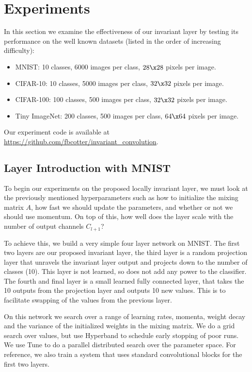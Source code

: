 \section{Experiments}\label{sec:experiments}
In this section we examine the effectiveness of our invariant layer by testing
its performance on the well known datasets (listed in the order of increasing
difficulty):
\begin{itemize}
  \item MNIST: 10 classes, 6000 images per class, $28\x 28$ pixels per image.
  \item CIFAR-10: 10 classes, 5000 images per class, $32\x 32$ pixels per image.
  \item CIFAR-100: 100 classes, 500 images per class, $32\x 32$ pixels per image. 
  \item Tiny ImageNet\cite{li_tiny_nodate}: 200 classes, 500 images per class, 
    $64 \x 64$ pixels per image. 
\end{itemize}
Our experiment code is available at
\url{https://github.com/fbcotter/invariant_convolution}.

\subsection{Layer Introduction with MNIST}\label{sec:ch5:mnist}
To begin our experiments on the proposed locally invariant layer, we must look at the
previously mentioned hyperparameters such as how to initialize the mixing matrix $A$, 
how fast we should update the parameters, and whether or not we should use
momentum. On top of this, how well does the layer scale with the number of
output channels $C_{l+1}$?

To achieve this, we build a very simple four layer network on MNIST. The first
two layers are our proposed invariant layer, the third layer is a random
projection layer that unravels the invariant layer output and projects
down to the number of classes (10). This layer is not learned, so does not add
any power to the classifier. The fourth and final layer is a small learned
fully connected layer, that takes the 10 outputs from the projection layer and
outputs 10 new values. This is to facilitate swapping of the values from the
previous layer. 

On this network we search over a range of learning rates, momenta, weight decay
and the variance of the initialized weights in the mixing matrix. We do a grid
search over values, but use Hyperband \cite{li_hyperband:_2016} to schedule early 
stopping of poor runs. We use Tune \cite{liaw2018tune} to do a parallel distributed
search over the parameter space. For reference, we also train a system that uses
standard convolutional blocks for the first two layers. 

